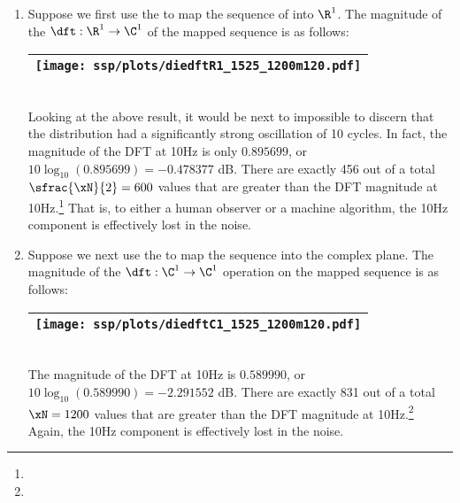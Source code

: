 \begin{example}
\begin{enumerate}
  \item \label{item:nonstat34_R1pam}
        Suppose we first use the   to map
        the sequence of  into $\R^1$.
        The magnitude of the $\dft:\R^1\to\C^1$ of the mapped sequence is as follows:
     \\\begin{tabular}{|>{\scs}c|}
          \hline
          \texttt{[image: ssp/plots/diedftR1\_1525\_1200m120.pdf]}%
        \\\hline
     \end{tabular}\\
     Looking at the above result, it would be next to impossible to discern that the distribution had a significantly strong
     oscillation of 10 cycles.
     In fact, the magnitude of the DFT at 10Hz is only $0.895699$, or $10\log_{10}(0.895699)=-0.478377$ dB.
     There are exactly 456 out of a total $\sfrac{\xN}{2}=600$ values that are greater than 
     the DFT magnitude at 10Hz.\footnote{}
     That is, to either a human observer or a machine algorithm, the 10Hz component is effectively lost in the noise.
     
  \item \label{item:nonstat34_C1qpsk}
    Suppose we next use the   to map
    the sequence into the complex plane.
    The magnitude of the $\dft:\C^1\to\C^1$ operation on the mapped sequence is as follows:
    \\\begin{tabular}{|>{\scs}c|}
         \hline
         \texttt{[image: ssp/plots/diedftC1\_1525\_1200m120.pdf]}%
       \\\hline
    \end{tabular}\\
    The magnitude of the DFT at 10Hz is $0.589990$, or $10\log_{10}(0.589990)=-2.291552$ dB.
    There are exactly 831 out of a total $\xN=1200$ values that are greater than 
    the DFT magnitude at 10Hz.\footnote{}
    Again, the 10Hz component is effectively lost in the noise.
     

\end{enumerate}
\end{example}
